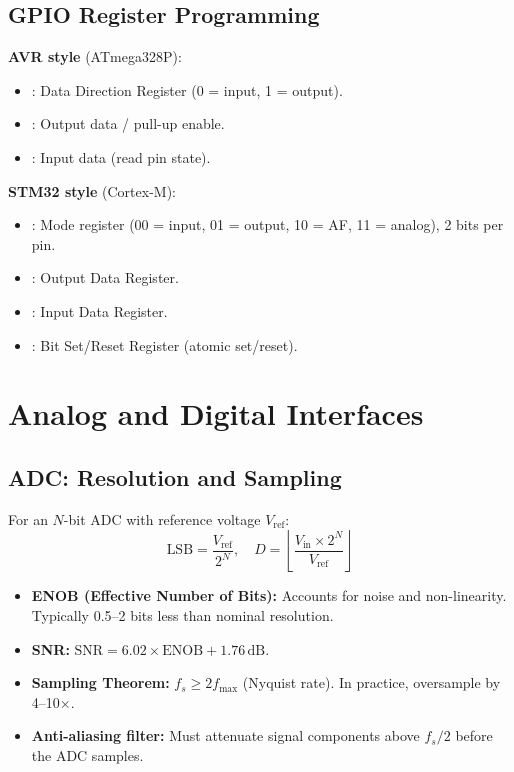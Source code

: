 \subsection{GPIO Register Programming}

\textbf{AVR style} (ATmega328P):
\begin{itemize}[nosep]
  \item {}: Data Direction Register (0 = input, 1 = output).
  \item {}: Output data / pull-up enable.
  \item {}: Input data (read pin state).
\end{itemize}

\textbf{STM32 style} (Cortex-M):
\begin{itemize}[nosep]
  \item {}: Mode register (00 = input, 01 = output, 10 = AF, 11 = analog), 2 bits per pin.
  \item {}: Output Data Register.
  \item {}: Input Data Register.
  \item {}: Bit Set/Reset Register (atomic set/reset).
\end{itemize}

\section{Analog and Digital Interfaces}
\label{sec:io:analog}

\subsection{ADC: Resolution and Sampling}

For an $N$-bit ADC with reference voltage $V_{\text{ref}}$:
\[
  \text{LSB} = \frac{V_{\text{ref}}}{2^N}, \quad D = \left\lfloor \frac{V_{\text{in}} \times 2^N}{V_{\text{ref}}} \right\rfloor
\]

\begin{itemize}
  \item \textbf{ENOB (Effective Number of Bits):} Accounts for noise and non-linearity. Typically 0.5--2 bits less than nominal resolution.
  \item \textbf{SNR:} $\text{SNR} = 6.02 \times \text{ENOB} + 1.76\,\text{dB}$.
  \item \textbf{Sampling Theorem:} $f_s \geq 2 f_{\text{max}}$ (Nyquist rate). In practice, oversample by 4--10$\times$.
  \item \textbf{Anti-aliasing filter:} Must attenuate signal components above $f_s/2$ before the ADC samples.
\end{itemize}

